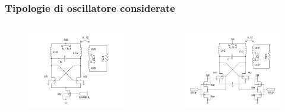 \documentclass{beamer}
\begin{document}
%
\begin{frame}
\frametitle{Tipologie di oscillatore considerate}
\begin{columns}
	\begin{flushleft}
      \begin{figure}
      \includegraphics[width=\textwidth]{images/tipo1.pdf}
      \end{figure}
      \end{flushleft}

      \begin{flushright}
      \begin{figure}
      \includegraphics[width=\textwidth]{images/tipo2.pdf}
      \end{figure}
      \end{flushright}
\end{columns}
\end{frame}
\end{document}
